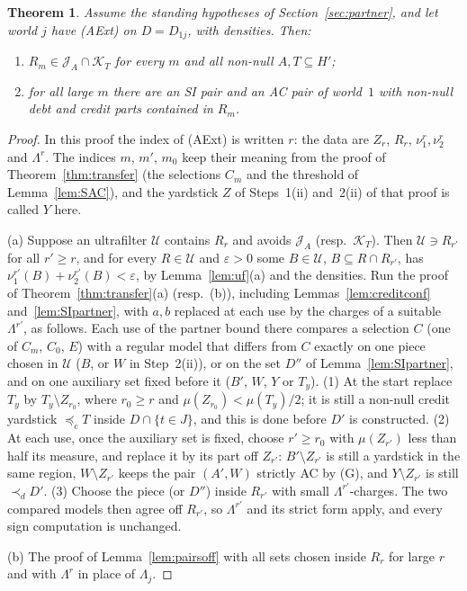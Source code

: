 \documentclass[11pt]{article}
\newtheorem{theorem}{Theorem}
\theoremstyle{definition}\newtheorem{definition}[theorem]{Definition}
\theoremstyle{remark}\newtheorem{remark}[theorem]{Remark}
\newcommand{\Jid}{\mathcal J}
\newcommand{\Kid}{\mathcal K}
\newcommand{\Uf}{\mathcal U}
\begin{document}
\begin{theorem}\label{thm:aexttransfer}
Assume the standing hypotheses of Section~\ref{sec:partner}, and let world
$j$ have (AExt) on $D=D_{1j}$, with densities. Then:
\begin{enumerate}[label=(\alph*)]
\item $R_m\in\Jid_A\cap\Kid_T$ for every $m$ and all non-null $A,T\subseteq
H'$;
\item for all large $m$ there are an SI pair and an AC pair of
world~$1$ with non-null debt and credit parts contained in $R_m$.
\end{enumerate}
\end{theorem}
\begin{proof}
In this proof the index of (AExt) is written $r$: the data are $Z_r$,
$R_r$, $\nu^r_1,\nu^r_2$ and $\Lambda^r$. The indices $m$, $m'$, $m_0$ keep
their meaning from the proof of Theorem~\ref{thm:transfer} (the selections
$C_m$ and the threshold of Lemma~\ref{lem:SAC}), and the yardstick $Z$ of
Steps~1(ii) and~2(ii) of that proof is called $Y$ here.

(a) Suppose an ultrafilter $\Uf$ contains $R_r$ and avoids $\Jid_A$
(resp.\ $\Kid_T$). Then $\Uf\ni R_{r'}$ for all $r'\ge r$, and for
every $R\in\Uf$ and $\varepsilon>0$ some $B\in\Uf$, $B\subseteq R\cap
R_{r'}$, has $\nu^{r'}_1(B)+\nu^{r'}_2(B)<\varepsilon$, by
Lemma~\ref{lem:uf}(a) and the densities. Run the proof of
Theorem~\ref{thm:transfer}(a) (resp.\ (b)), including
Lemmas~\ref{lem:creditconf} and~\ref{lem:SIpartner}, with $a,b$ replaced at
each use by the charges of a suitable $\Lambda^{r'}$, as follows. Each
use of the partner bound there compares a selection $C$ (one of $C_m$,
$C_0$, $E$) with a regular model that differs from $C$ exactly on one piece
chosen in $\Uf$ ($B$, or $W$ in Step~2(ii)), or on the set $D''$ of
Lemma~\ref{lem:SIpartner}, and on one auxiliary set fixed before it ($B'$,
$W$, $Y$ or $T_y$). (1) At the start replace $T_y$ by
$T_y\setminus Z_{r_0}$, where $r_0\ge r$ and
$\mu(Z_{r_0})<\mu(T_y)/2$; it is still a non-null credit yardstick
$\preceq_cT$ inside $D\cap\{t\in J\}$, and this is done before $D'$ is
constructed. (2) At each use, once the auxiliary set is fixed, choose
$r'\ge r_0$ with $\mu(Z_{r'})$ less than half its measure, and replace
it by its part off $Z_{r'}$: $B'\setminus Z_{r'}$ is still a yardstick
in the same region, $W\setminus Z_{r'}$ keeps the pair $(A',W)$
strictly AC by (G), and $Y\setminus Z_{r'}$ is still $\prec_dD'$. (3)
Choose the piece (or $D''$) inside $R_{r'}$ with small
$\Lambda^{r'}$-charges. The two compared models then agree off
$R_{r'}$, so $\Lambda^{r'}$ and its strict form apply, and every
sign computation is unchanged.

(b) The proof of Lemma~\ref{lem:pairsoff} with all sets chosen inside
$R_r$ for large $r$ and with $\Lambda^r$ in place of $\Lambda_j$.
\end{proof}
\end{document}
